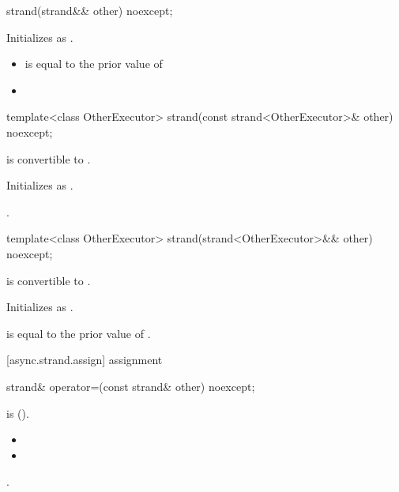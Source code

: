 \begin{itemdecl}
strand(strand&& other) noexcept;
\end{itemdecl}

\begin{itemdescr}
\pnum
\effects Initializes  as .

\pnum
\postconditions 
\begin{itemize}
\item
{} is equal to the prior value of 
\item
{}
\end{itemize}
\end{itemdescr}

\begin{itemdecl}
template<class OtherExecutor> strand(const strand<OtherExecutor>& other) noexcept;
\end{itemdecl}

\begin{itemdescr}
\pnum
\requires {} is convertible to .

\pnum
\effects Initializes  as .

\pnum
\postconditions {}.
\end{itemdescr}

\begin{itemdecl}
template<class OtherExecutor> strand(strand<OtherExecutor>&& other) noexcept;
\end{itemdecl}

\begin{itemdescr}
\pnum
\requires {} is convertible to .

\pnum
\effects Initializes  as .

\pnum
\postconditions {} is equal to the prior value of .
\end{itemdescr}



[async.strand.assign]{ assignment}

%
\begin{itemdecl}
strand& operator=(const strand& other) noexcept;
\end{itemdecl}

\begin{itemdescr}
\pnum
\requires {} is  ().

\pnum
\postconditions 
\begin{itemize}
\item
{}
\item
{}
\end{itemize}

\pnum
\returns {}.
\end{itemdescr}

